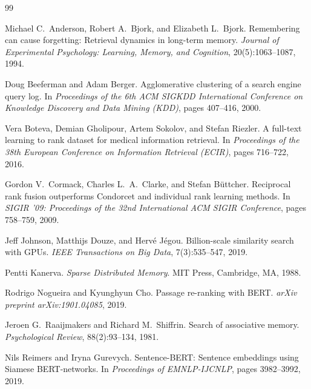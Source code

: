 \documentclass[11pt,a4paper]{article}
\begin{document}
\begin{thebibliography}{99}

Michael C.\ Anderson, Robert A.\ Bjork, and Elizabeth L.\ Bjork.
\newblock Remembering can cause forgetting: Retrieval dynamics in long-term memory.
\newblock \emph{Journal of Experimental Psychology: Learning, Memory, and Cognition}, 20(5):1063--1087, 1994.

Doug Beeferman and Adam Berger.
\newblock Agglomerative clustering of a search engine query log.
\newblock In \emph{Proceedings of the 6th ACM SIGKDD International Conference on Knowledge Discovery and Data Mining (KDD)}, pages 407--416, 2000.

Vera Boteva, Demian Gholipour, Artem Sokolov, and Stefan Riezler.
\newblock A full-text learning to rank dataset for medical information retrieval.
\newblock In \emph{Proceedings of the 38th European Conference on Information Retrieval (ECIR)}, pages 716--722, 2016.

Gordon V.\ Cormack, Charles L.\ A.\ Clarke, and Stefan B\"uttcher.
\newblock Reciprocal rank fusion outperforms Condorcet and individual rank learning methods.
\newblock In \emph{SIGIR '09: Proceedings of the 32nd International ACM SIGIR Conference}, pages 758--759, 2009.

Jeff Johnson, Matthijs Douze, and Herv\'e J\'egou.
\newblock Billion-scale similarity search with GPUs.
\newblock \emph{IEEE Transactions on Big Data}, 7(3):535--547, 2019.

Pentti Kanerva.
\newblock \emph{Sparse Distributed Memory}.
\newblock MIT Press, Cambridge, MA, 1988.

Rodrigo Nogueira and Kyunghyun Cho.
\newblock Passage re-ranking with BERT.
\newblock \emph{arXiv preprint arXiv:1901.04085}, 2019.

Jeroen G.\ Raaijmakers and Richard M.\ Shiffrin.
\newblock Search of associative memory.
\newblock \emph{Psychological Review}, 88(2):93--134, 1981.

Nils Reimers and Iryna Gurevych.
\newblock Sentence-BERT: Sentence embeddings using Siamese BERT-networks.
\newblock In \emph{Proceedings of EMNLP-IJCNLP}, pages 3982--3992, 2019.


\end{thebibliography}
\end{document}
